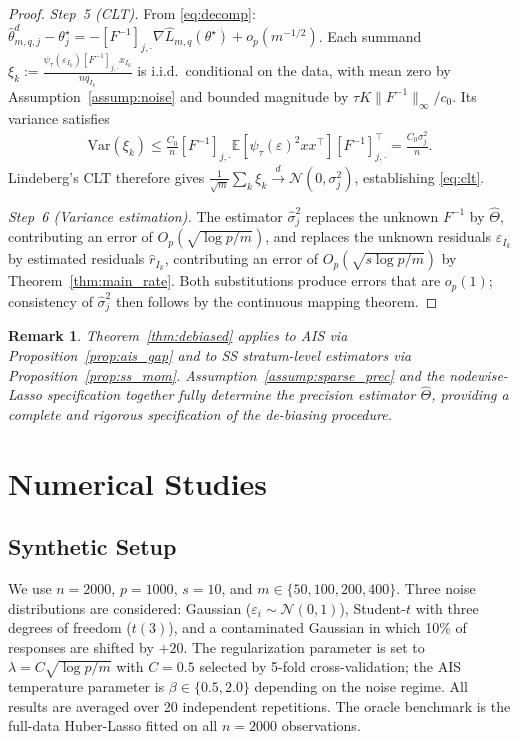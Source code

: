 \documentclass[10pt]{article}
\newtheorem{remark}[theorem]{Remark}
\newcommand{\E}{\mathbb{E}}
\newcommand{\hL}{\hat{L}}
\newcommand{\hth}{\hat{\theta}}
\newcommand{\ts}{\theta^{\star}}
\newcommand{\hTh}{\hat{\Theta}}
\newcommand{\Op}{O_p}
\begin{document}
\begin{proof}
\textit{Step~5 (CLT).}
From \eqref{eq:decomp}:
$\hth^d_{m,q,j}-\ts_j
=-[F^{-1}]_{j,\cdot}\nabla\hL_{m,q}(\ts)+o_p(m^{-1/2})$.
Each summand $\xi_k:=\frac{\psi_\tau(\varepsilon_{I_k})[F^{-1}]_{j,\cdot}x_{I_k}}{nq_{I_k}}$
is i.i.d.\ conditional on the data, with mean zero by
Assumption~\ref{assump:noise} and bounded magnitude by $\tau K\|F^{-1}\|_\infty/c_0$.
Its variance satisfies
\begin{align*}
  \mathrm{Var}(\xi_k)
  \le\frac{C_0}{n}[F^{-1}]_{j,\cdot}\E[\psi_\tau(\varepsilon)^2xx^\top][F^{-1}]_{j,\cdot}^\top
  =\frac{C_0\sigma_j^2}{n}.
\end{align*}
Lindeberg's CLT therefore gives
$\frac{1}{\sqrt{m}}\sum_k\xi_k\xrightarrow{d}\mathcal{N}(0,\sigma_j^2)$,
establishing \eqref{eq:clt}.

\textit{Step~6 (Variance estimation).}
The estimator $\hat\sigma_j^2$ replaces the unknown $F^{-1}$ by $\hTh$,
contributing an error of $\Op(\sqrt{\log p/m})$, and replaces the unknown
residuals $\varepsilon_{I_k}$ by estimated residuals $\hat r_{I_k}$,
contributing an error of $\Op(\sqrt{s\log p/m})$ by Theorem~\ref{thm:main_rate}.
Both substitutions produce errors that are $o_p(1)$; consistency of $\hat\sigma_j^2$
then follows by the continuous mapping theorem.
\end{proof}

\begin{remark}
Theorem~\ref{thm:debiased} applies to AIS via Proposition~\ref{prop:ais_gap}
and to SS stratum-level estimators via Proposition~\ref{prop:ss_mom}.
Assumption~\ref{assump:sparse_prec} and the nodewise-Lasso specification
together fully determine the precision estimator $\hTh$, providing
a complete and rigorous specification of the de-biasing procedure.
\end{remark}

\section{Numerical Studies}
\label{sec:experiments}

\subsection{Synthetic Setup}

We use $n{=}2000$, $p{=}1000$, $s{=}10$, and $m\in\{50,100,200,400\}$.
Three noise distributions are considered: Gaussian ($\varepsilon_i\sim\mathcal{N}(0,1)$),
Student-$t$ with three degrees of freedom ($t(3)$), and a contaminated Gaussian
in which 10\% of responses are shifted by $+20$.
The regularization parameter is set to $\lambda=C\sqrt{\log p/m}$ with $C{=}0.5$
selected by 5-fold cross-validation; the AIS temperature parameter is
$\beta\in\{0.5,2.0\}$ depending on the noise regime.
All results are averaged over 20 independent repetitions.
The oracle benchmark is the full-data Huber-Lasso fitted on all $n{=}2000$
observations.
\end{document}
